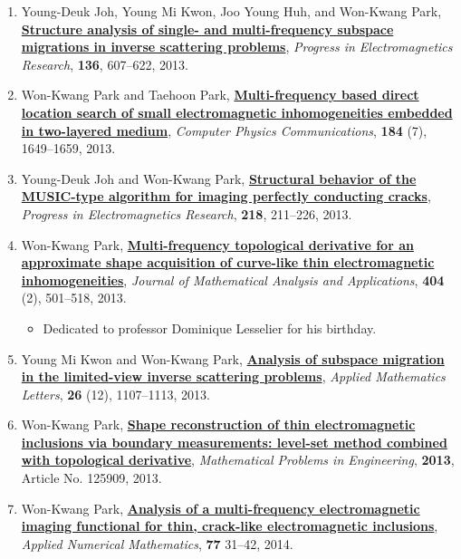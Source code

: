 \documentclass[10pt,A4]{article}
\begin{document}
\begin{enumerate}
\item\label{A-PIER2013A} Young-Deuk Joh, Young Mi Kwon, Joo Young Huh, and Won-Kwang Park, \href{http://dx.doi.org/10.2528/PIER12120313}{\textbf{Structure analysis of single- and multi-frequency subspace migrations in inverse scattering problems}}, \textit{Progress in Electromagnetics Research}, \textbf{136}, 607--622, 2013.
\item\label{A-CPC2013} Won-Kwang Park and Taehoon Park, \href{http://dx.doi.org/10.1016/j.cpc.2013.02.008}{\textbf{Multi-frequency based direct location search of small electromagnetic inhomogeneities embedded in two-layered medium}}, \textit{Computer Physics Communications}, \textbf{184} (7), 1649--1659, 2013.
\item\label{A-PIER2013B} Young-Deuk Joh and Won-Kwang Park, \href{http://dx.doi.org/10.2528/PIER13013104}{\textbf{Structural behavior of the MUSIC-type algorithm for imaging perfectly conducting cracks}}, \textit{Progress in Electromagnetics Research}, \textbf{218}, 211--226, 2013.
\item\label{A-JMMA2013} Won-Kwang Park, \href{http://dx.doi.org/10.1016/j.jmaa.2013.03.040}{\textbf{Multi-frequency topological derivative for an approximate shape acquisition of curve-like thin electromagnetic inhomogeneities}}, \textit{Journal of Mathematical Analysis and Applications}, \textbf{404} (2), 501--518, 2013.
    \begin{itemize}
      \item Dedicated to professor Dominique Lesselier for his  birthday.
    \end{itemize}
\item\label{A-AML2013} Young Mi Kwon and Won-Kwang Park, \href{http://dx.doi.org/10.1016/j.aml.2013.05.015}{\textbf{Analysis of subspace migration in the limited-view inverse scattering problems}}, \textit{Applied Mathematics Letters}, \textbf{26} (12), 1107--1113, 2013.
\item\label{A-MPE2013} Won-Kwang Park, \href{http://dx.doi.org/10.1155/2013/125909}{\textbf{Shape reconstruction of thin electromagnetic inclusions via boundary measurements: level-set method combined with topological derivative}}, \textit{Mathematical Problems in Engineering}, \textbf{2013}, Article No. 125909, 2013.
\item\label{A-APNUM2014} Won-Kwang Park, \href{http://dx.doi.org/10.1016/j.apnum.2013.11.001}{\textbf{Analysis of a multi-frequency electromagnetic imaging functional for thin, crack-like electromagnetic inclusions}}, \textit{Applied Numerical Mathematics}, \textbf{77} 31--42, 2014.

\end{enumerate}
\end{document}
